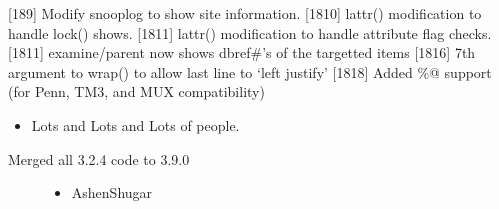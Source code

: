 \documentclass[letterpaper,10pt,english]{sphinxmanual}
\begin{document}
\sphinxAtStartPar
{[}18\sphinxhyphen{}9{]} Modify snooplog to show site information.
{[}18\sphinxhyphen{}10{]} lattr() modification to handle lock() shows.
{[}18\sphinxhyphen{}11{]} lattr() modification to handle attribute flag checks.
{[}18\sphinxhyphen{}11{]} examine/parent now shows dbref\#’s of the targetted items
{[}18\sphinxhyphen{}16{]} 7th argument to wrap() to allow last line to ‘left justify’
{[}18\sphinxhyphen{}18{]} Added \%@ support (for Penn, TM3, and MUX compatibility)
\begin{itemize}
\item {} 
\sphinxAtStartPar
Lots and Lots and Lots of people.

\end{itemize}
\begin{description}
\item[{Merged all 3.2.4 code to 3.9.0}] \leavevmode\begin{itemize}
\item {} 
\sphinxAtStartPar
Ashen\sphinxhyphen{}Shugar

\end{itemize}

\end{description}
\end{document}
